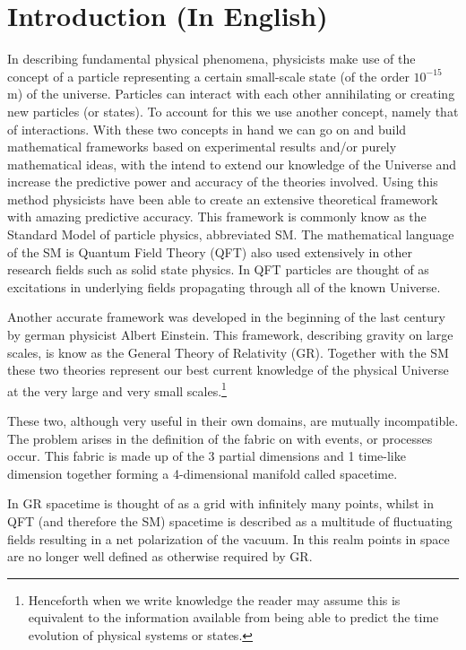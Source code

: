 \section{Introduction (In English)}
In describing fundamental physical phenomena, physicists make use of the concept of a particle representing a certain small-scale state (of the order $10^{-15}$ m) of the universe. Particles can interact with each other annihilating or creating new particles (or states). To account for this we use another concept, namely that of interactions. With these two concepts in hand we can go on and build mathematical frameworks based on experimental results and/or purely mathematical ideas, with the intend to extend our knowledge of the Universe and increase the predictive power and accuracy of the theories involved. Using this method physicists have been able to create an extensive theoretical framework with amazing predictive accuracy. This framework is commonly know as the Standard Model of particle physics, abbreviated SM. The mathematical language of the SM is Quantum Field Theory (QFT) also used extensively in other research fields such as solid state physics. In QFT particles are thought of as excitations in underlying fields propagating through all of the known Universe.

Another accurate framework was developed in the beginning of the last century by german physicist Albert Einstein. This framework, describing gravity on large scales, is know as the General Theory of Relativity (GR). Together with the SM these two theories represent our best current knowledge of the physical Universe at the very large and very small scales.\footnote{Henceforth when we write knowledge the reader may assume this is equivalent to the information available from being able to predict the time evolution of physical systems or states.}

These two, although very useful in their own domains, are mutually incompatible. The problem arises in the definition of the fabric on with events, or processes occur. This fabric is made up of the 3 partial dimensions and 1 time-like dimension together forming a 4-dimensional manifold called spacetime.

In GR spacetime is thought of as a grid with infinitely many points, whilst in QFT (and therefore the SM) spacetime is described as a multitude of fluctuating fields resulting in a net polarization of the vacuum. In this realm points in space are no longer well defined as otherwise required by GR.

